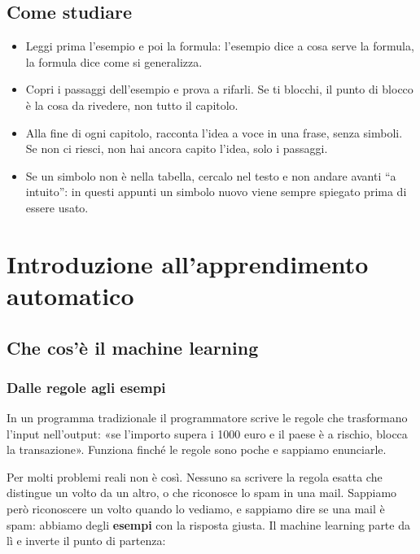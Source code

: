 \documentclass[12pt]{extarticle}
\begin{document}
\subsection*{Come studiare}

\begin{itemize}
    \item Leggi prima l'esempio e poi la formula: l'esempio dice a cosa serve la formula, la formula dice come si generalizza.
    \item Copri i passaggi dell'esempio e prova a rifarli. Se ti blocchi, il punto di blocco è la cosa da rivedere, non tutto il capitolo.
    \item Alla fine di ogni capitolo, racconta l'idea a voce in una frase, senza simboli. Se non ci riesci, non hai ancora capito l'idea, solo i passaggi.
    \item Se un simbolo non è nella tabella, cercalo nel testo e non andare avanti ``a intuito'': in questi appunti un simbolo nuovo viene sempre spiegato prima di essere usato.
\end{itemize}

\newpage

\section{Introduzione all'apprendimento automatico}

\subsection{Che cos'è il machine learning}

\subsubsection{Dalle regole agli esempi}

\noindent In un programma tradizionale il programmatore scrive le regole che trasformano l'input nell'output: «se l'importo supera i 1000 euro e il paese è a rischio, blocca la transazione». Funziona finché le regole sono poche e sappiamo enunciarle.

\noindent Per molti problemi reali non è così. Nessuno sa scrivere la regola esatta che distingue un volto da un altro, o che riconosce lo spam in una mail. Sappiamo però riconoscere un volto quando lo vediamo, e sappiamo dire se una mail è spam: abbiamo degli \textbf{esempi} con la risposta giusta. Il machine learning parte da lì e inverte il punto di partenza:
\end{document}
